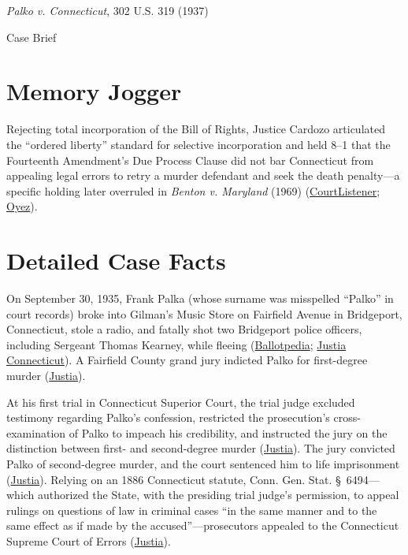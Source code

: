 \documentclass[12pt]{article}
\begin{document}
\begin{center}
{\LARGE \textit{Palko v. Connecticut}, 302 U.S. 319 (1937)\par}
\vspace{0.8em}
{\large Case Brief\par}
\end{center}
\vspace{1em}

\section{Memory Jogger}

Rejecting total incorporation of the Bill of Rights, Justice Cardozo articulated the ``ordered liberty'' standard for selective incorporation and held 8--1 that the Fourteenth Amendment's Due Process Clause did not bar Connecticut from appealing legal errors to retry a murder defendant and seek the death penalty---a specific holding later overruled in \textit{Benton v. Maryland} (1969) (\href{https://www.courtlistener.com/opinion/102879/palko-v-connecticut/}{CourtListener}; \href{https://www.oyez.org/cases/1900-1940/302us319}{Oyez}).

\section{Detailed Case Facts}

On September 30, 1935, Frank Palka (whose surname was misspelled ``Palko'' in court records) broke into Gilman's Music Store on Fairfield Avenue in Bridgeport, Connecticut, stole a radio, and fatally shot two Bridgeport police officers, including Sergeant Thomas Kearney, while fleeing (\href{https://ballotpedia.org/Palko_v._Connecticut}{Ballotpedia}; \href{https://law.justia.com/cases/connecticut/supreme-court/1936/121-conn-669.html}{Justia Connecticut}). A Fairfield County grand jury indicted Palko for first-degree murder (\href{https://supreme.justia.com/cases/federal/us/302/319/}{Justia}).

At his first trial in Connecticut Superior Court, the trial judge excluded testimony regarding Palko's confession, restricted the prosecution's cross-examination of Palko to impeach his credibility, and instructed the jury on the distinction between first- and second-degree murder (\href{https://supreme.justia.com/cases/federal/us/302/319/}{Justia}). The jury convicted Palko of second-degree murder, and the court sentenced him to life imprisonment (\href{https://supreme.justia.com/cases/federal/us/302/319/}{Justia}). Relying on an 1886 Connecticut statute, Conn. Gen. Stat. \S~6494---which authorized the State, with the presiding trial judge's permission, to appeal rulings on questions of law in criminal cases ``in the same manner and to the same effect as if made by the accused''---prosecutors appealed to the Connecticut Supreme Court of Errors (\href{https://supreme.justia.com/cases/federal/us/302/319/}{Justia}).
\end{document}
